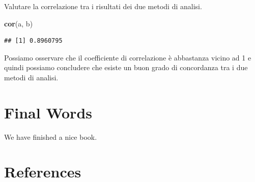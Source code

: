 \documentclass[a4paper,12pt,oneside]{book}
\newenvironment{Shaded}{\begin{snugshade}}{\end{snugshade}}
\newcommand{\KeywordTok}[1]{\textcolor[rgb]{0.13,0.29,0.53}{\textbf{#1}}}
\newcommand{\NormalTok}[1]{#1}
\begin{document}
Valutare la correlazione tra i risultati dei due metodi di analisi.

\begin{Shaded}
\begin{Highlighting}[]
\KeywordTok{cor}\NormalTok{(a, b)}
\end{Highlighting}
\end{Shaded}

\begin{verbatim}
## [1] 0.8960795
\end{verbatim}

Possiamo osservare che il coefficiente di correlazione è abbastanza
vicino ad 1 e quindi possiamo concludere che esiste un buon grado di
concordanza tra i due metodi di analisi.

\chapter{Final Words}\label{final-words}

We have finished a nice book.

\chapter*{References}\label{references}
\end{document}
